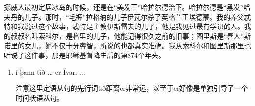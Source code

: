 \begin{translation*}{}
    挪威人最初定居冰岛的时候，还是在“美发王”哈拉尔德治下。哈拉尔德是“黑发”哈夫丹的儿子。那时，“毛裤”拉格纳的儿子伊瓦尔杀了英格兰王埃德蒙。我的养父忒特和我说过这个故事，忒特是主教伊斯雷夫的儿子，他是我见过最有学识的人。我的叔叔名叫索科尔，是格里的儿子，他能记得很久之前的旧事；图里斯是“善人”斯诺里的女儿，她不仅十分睿智，所说的也都真实准确。我从索科尔和图里斯那里也听说了这件事，那是耶稣基督降生后的第874个年头。
\end{translation*}
\begin{grammar*}{}
    \begin{enumerate}[leftmargin=*]
        \item í þann tíð ... er Ívarr ...

              注意这里定语从句的先行词tíð距离er非常远，以至于er好像是单独引导了一个时间状语从句。
    \end{enumerate}
\end{grammar*}
